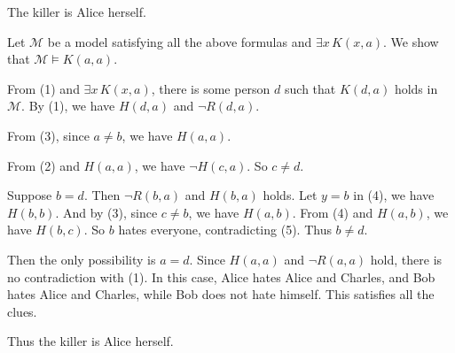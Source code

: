 \documentclass{article}
\begin{document}
The killer is Alice herself.

Let $\mathcal M$ be a model satisfying all the above formulas and $\exists x\, K(x,a)$. We show that $\mathcal M \models K(a,a)$.

From (1) and $\exists x\, K(x,a)$, there is some person $d$ such that $K(d,a)$ holds in $\mathcal M$. By (1), we have $H(d,a)$ and $\neg R(d,a)$.

From (3), since $a \neq b$, we have $H(a,a)$.

From (2) and $H(a,a)$, we have $\neg H(c,a)$. So $c \neq d$.

Suppose $b = d$. Then $\neg R(b,a)$ and $H(b, a)$ holds. Let $y=b$ in (4), we have $H(b,b)$. And by (3), since $c \neq b$, we have $H(a,b)$. From (4) and $H(a,b)$, we have $H(b,c)$. So $b$ hates everyone, contradicting (5). Thus $b \neq d$.

Then the only possibility is $a = d$. Since $H(a, a)$ and $\neg R(a, a)$ hold, there is no contradiction with (1). In this case, Alice hates Alice and Charles, and Bob hates Alice and Charles, while Bob does not hate himself. This satisfies all the clues. 

Thus the killer is Alice herself.
\end{document}
